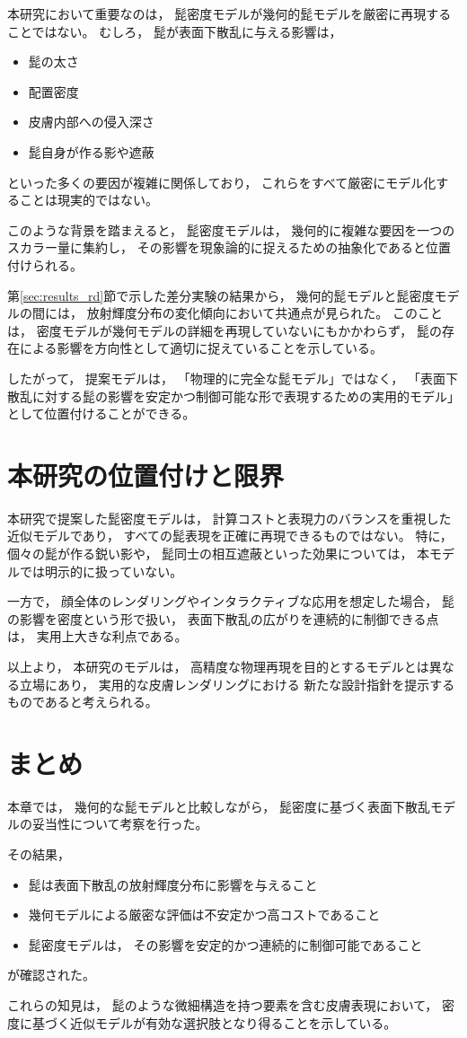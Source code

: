 本研究において重要なのは，
髭密度モデルが幾何的髭モデルを厳密に再現することではない。
むしろ，
髭が表面下散乱に与える影響は，

\begin{itemize}
  \item 髭の太さ
  \item 配置密度
  \item 皮膚内部への侵入深さ
  \item 髭自身が作る影や遮蔽
\end{itemize}

といった多くの要因が複雑に関係しており，
これらをすべて厳密にモデル化することは現実的ではない。

このような背景を踏まえると，
髭密度モデルは，
幾何的に複雑な要因を一つのスカラー量に集約し，
その影響を現象論的に捉えるための抽象化であると位置付けられる。

第\ref{sec:results_rd}節で示した差分実験の結果から，
幾何的髭モデルと髭密度モデルの間には，
放射輝度分布の変化傾向において共通点が見られた。
このことは，
密度モデルが幾何モデルの詳細を再現していないにもかかわらず，
髭の存在による影響を方向性として適切に捉えていることを示している。

したがって，
提案モデルは，
「物理的に完全な髭モデル」ではなく，
「表面下散乱に対する髭の影響を安定かつ制御可能な形で表現するための実用的モデル」
として位置付けることができる。

\section{本研究の位置付けと限界}

本研究で提案した髭密度モデルは，
計算コストと表現力のバランスを重視した近似モデルであり，
すべての髭表現を正確に再現できるものではない。
特に，
個々の髭が作る鋭い影や，
髭同士の相互遮蔽といった効果については，
本モデルでは明示的に扱っていない。

一方で，
顔全体のレンダリングやインタラクティブな応用を想定した場合，
髭の影響を密度という形で扱い，
表面下散乱の広がりを連続的に制御できる点は，
実用上大きな利点である。

以上より，
本研究のモデルは，
高精度な物理再現を目的とするモデルとは異なる立場にあり，
実用的な皮膚レンダリングにおける
新たな設計指針を提示するものであると考えられる。

\section{まとめ}

本章では，
幾何的な髭モデルと比較しながら，
髭密度に基づく表面下散乱モデルの妥当性について考察を行った。

その結果，

\begin{itemize}
  \item 髭は表面下散乱の放射輝度分布に影響を与えること
  \item 幾何モデルによる厳密な評価は不安定かつ高コストであること
  \item 髭密度モデルは，
        その影響を安定的かつ連続的に制御可能であること
\end{itemize}

が確認された。

これらの知見は，
髭のような微細構造を持つ要素を含む皮膚表現において，
密度に基づく近似モデルが有効な選択肢となり得ることを示している。

